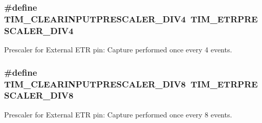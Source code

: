 \subsubsection[{\texorpdfstring{T\+I\+M\+\_\+\+C\+L\+E\+A\+R\+I\+N\+P\+U\+T\+P\+R\+E\+S\+C\+A\+L\+E\+R\+\_\+\+D\+I\+V4}{TIM_CLEARINPUTPRESCALER_DIV4}}]{\setlength{\rightskip}{0pt plus 5cm}\#define T\+I\+M\+\_\+\+C\+L\+E\+A\+R\+I\+N\+P\+U\+T\+P\+R\+E\+S\+C\+A\+L\+E\+R\+\_\+\+D\+I\+V4~{\bf T\+I\+M\+\_\+\+E\+T\+R\+P\+R\+E\+S\+C\+A\+L\+E\+R\+\_\+\+D\+I\+V4}}\hypertarget{group___t_i_m___clear_input___prescaler_gae3c3dea810bb9d83b532737f01a3213d}{}\label{group___t_i_m___clear_input___prescaler_gae3c3dea810bb9d83b532737f01a3213d}
Prescaler for External E\+TR pin\+: Capture performed once every 4 events. 
\subsubsection[{\texorpdfstring{T\+I\+M\+\_\+\+C\+L\+E\+A\+R\+I\+N\+P\+U\+T\+P\+R\+E\+S\+C\+A\+L\+E\+R\+\_\+\+D\+I\+V8}{TIM_CLEARINPUTPRESCALER_DIV8}}]{\setlength{\rightskip}{0pt plus 5cm}\#define T\+I\+M\+\_\+\+C\+L\+E\+A\+R\+I\+N\+P\+U\+T\+P\+R\+E\+S\+C\+A\+L\+E\+R\+\_\+\+D\+I\+V8~{\bf T\+I\+M\+\_\+\+E\+T\+R\+P\+R\+E\+S\+C\+A\+L\+E\+R\+\_\+\+D\+I\+V8}}\hypertarget{group___t_i_m___clear_input___prescaler_ga34bc6cb7ee8800cc48b1ee6c536859cc}{}\label{group___t_i_m___clear_input___prescaler_ga34bc6cb7ee8800cc48b1ee6c536859cc}
Prescaler for External E\+TR pin\+: Capture performed once every 8 events. 